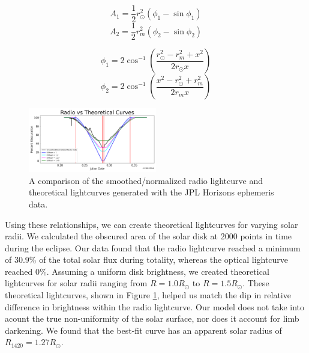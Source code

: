 \begin{equation}
  A_1 = \frac{1}{2}r_{\odot}^2\left(\phi_1 - \sin\phi_1\right)
\end{equation}
\begin{equation}
  A_2 = \frac{1}{2}r_{m}^2\left(\phi_2 - \sin\phi_2\right)
\end{equation}

\begin{equation}
  \phi_1 = 2\cos^{-1}\left(\frac{r_{\odot}^2 - r_{m}^2+x^2}{2r_{\odot}x}\right)
\end{equation}
\begin{equation}
  \phi_2 = 2\cos^{-1}\left(\frac{x^2 - r_{\odot}^2 + r_{m}^2}{2r_{m}x}\right)
\end{equation}


\begin{figure}
  \includegraphics[width=0.5\textwidth]{figures/RadiovsTheoretical.png}
  \caption{\label{fig:RadiovsTheoretical} A comparison of the smoothed/normalized radio lightcurve and theoretical lightcurves generated with the JPL Horizons ephemeris data.}
\end{figure}

Using these relationships, we can create theoretical lightcurves for varying solar radii.
We calculated the obscured area of the solar disk at 2000 points in time during the eclipse.
Our data found that the radio lightcurve reached a minimum of 30.9\% of the total solar flux during totality, whereas the optical lightcurve reached 0\%.
Assuming a uniform disk brightness, we created theoretical lightcurves for solar radii ranging from $R = 1.0 R_{\odot}$ to $R = 1.5 R_{\odot}$.
These theoretical lightcurves, shown in Figure \ref{fig:RadiovsTheoretical}, helped us match the dip in relative difference in brightness within the radio lightcurve.
Our model does not take into acount the true non-uniformity of the solar surface, nor does it account for limb darkening.
We found that the best-fit curve has an apparent solar radius of $R_{\mathrm{1420}} = 1.27 R_{\odot}$.